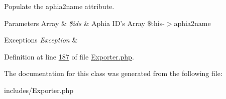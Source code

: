 Populate the aphia2name attribute. 


\begin{DoxyParams}[1]{Parameters}
Array & {\em \$ids} & Aphia I\-D's  Array \$this-\/$>$aphia2name \\
\hline
\end{DoxyParams}

\begin{DoxyExceptions}{Exceptions}
{\em Exception} & \\
\hline
\end{DoxyExceptions}


Definition at line \hyperlink{Exporter_8php_source_l00187}{187} of file \hyperlink{Exporter_8php_source}{Exporter.\-php}.



The documentation for this class was generated from the following file\-:\begin{DoxyCompactItemize}
\item 
includes/Exporter.\-php\end{DoxyCompactItemize}
